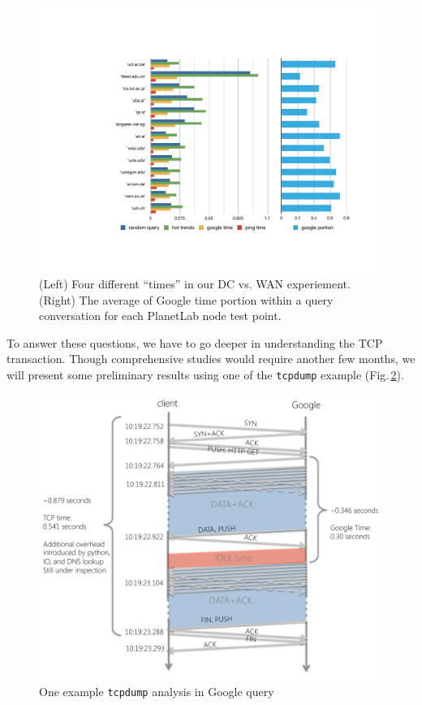 \begin{figure}[!htb]
  \centering
  \includegraphics[width=\linewidth]{../figs/data_center.pdf}
  \caption{(Left) Four different ``times'' in our DC vs. WAN experiement. (Right) The average of Google time portion within a query conversation for each PlanetLab node test point.}
  \label{fig:data_center}
\end{figure}

To answer these questions, we have to go deeper in understanding the TCP transaction. Though comprehensive studies would require another few months,  we will present some preliminary results using one of the \texttt{tcpdump} example (Fig.\,\ref{fig:tcpdump}). 

\begin{figure}
  \centering
  \includegraphics[width=\linewidth]{../figs/tcpdump.pdf}
  \caption{One example \texttt{tcpdump} analysis in Google query}
  \label{fig:tcpdump}
\end{figure}

